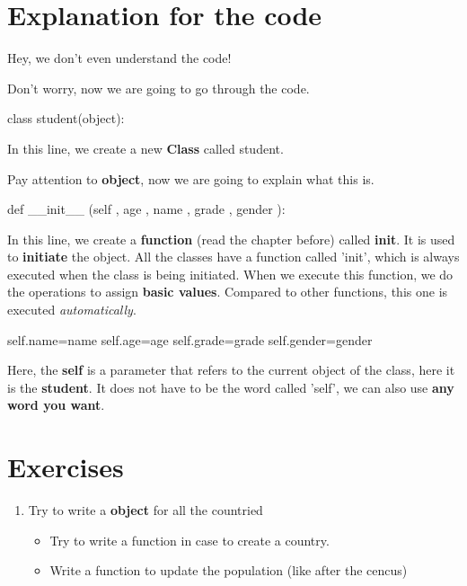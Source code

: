 \documentclass[12pt]{article}
\begin{document}
\section{Explanation for the code}
\begin{tcolorbox}[colback=blue!5!white,colframe=blue!50!white,title=Reader's Complain]
	Hey, we don't even understand the code!
\end{tcolorbox}
\par Don't worry, now we are going to go through the code.
\begin{python}
	class student(object):
\end{python}
\par In this line, we create a new \textbf{Class} called student.
\par Pay attention to \textbf{object}, now we are going to explain what this is.
\begin{python}
	def __init__ (self , age , name , grade , gender ):
\end{python}
\par In this line, we create a \textbf{function} (read the chapter before) called \textbf{init}. It is used to \textbf{initiate} the object. All the classes have a function called 'init', which is always executed when the class is being initiated. When we execute this function, we do the operations to assign \textbf{basic values}. Compared to other functions, this one is executed \textit{automatically}.
\begin{python}
  self.name=name	
	self.age=age
	self.grade=grade
	self.gender=gender
\end{python}
\par Here, the \textbf{self} is a parameter that refers to the current object of the class, here it is the \textbf{student}. It does not have to be the word called 'self', we can also use \textbf{any word you want}.
\section{Exercises}
\begin{enumerate}
	\item Try to write a \textbf{object} for all the countried
		\begin{itemize}
			\item Try to write a function in case to create a country.
			\item Write a function to update the population (like after the cencus)
		\end{itemize}
\end{enumerate}
\printbibliography
\end{document}
